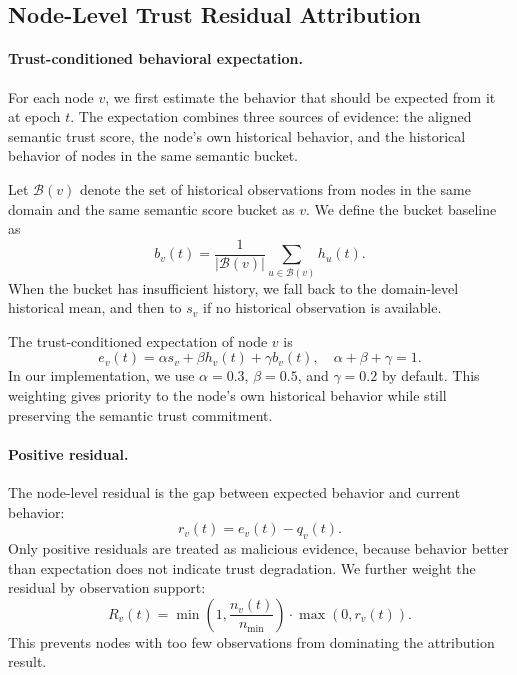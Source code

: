 \subsection{Node-Level Trust Residual Attribution}
\label{sec:node-attribution}

\paragraph{Trust-conditioned behavioral expectation.}
For each node $v$, we first estimate the behavior that should be expected
from it at epoch $t$. The expectation combines three sources of evidence:
the aligned semantic trust score, the node's own historical behavior, and
the historical behavior of nodes in the same semantic bucket.

Let $\mathcal{B}(v)$ denote the set of historical observations from nodes
in the same domain and the same semantic score bucket as $v$. We define
the bucket baseline as
\begin{equation}
    b_v(t) = \frac{1}{|\mathcal{B}(v)|}
    \sum_{u \in \mathcal{B}(v)} h_u(t).
    \label{eq:bucket-baseline}
\end{equation}
When the bucket has insufficient history, we fall back to the domain-level
historical mean, and then to $s_v$ if no historical observation is available.

The trust-conditioned expectation of node $v$ is
\begin{equation}
    e_v(t) =
    \alpha s_v + \beta h_v(t) + \gamma b_v(t),
    \quad \alpha + \beta + \gamma = 1.
    \label{eq:expectation}
\end{equation}
In our implementation, we use $\alpha=0.3$, $\beta=0.5$, and $\gamma=0.2$
by default. This weighting gives priority to the node's own historical
behavior while still preserving the semantic trust commitment.

\paragraph{Positive residual.}
The node-level residual is the gap between expected behavior and current
behavior:
\begin{equation}
    r_v(t) = e_v(t) - q_v(t).
    \label{eq:raw-residual}
\end{equation}
Only positive residuals are treated as malicious evidence, because behavior
better than expectation does not indicate trust degradation. We further
weight the residual by observation support:
\begin{equation}
    R_v(t) =
    \min\left(1, \frac{n_v(t)}{n_{\min}}\right)
    \cdot
    \max(0, r_v(t)).
    \label{eq:weighted-residual}
\end{equation}
This prevents nodes with too few observations from dominating the
attribution result.

